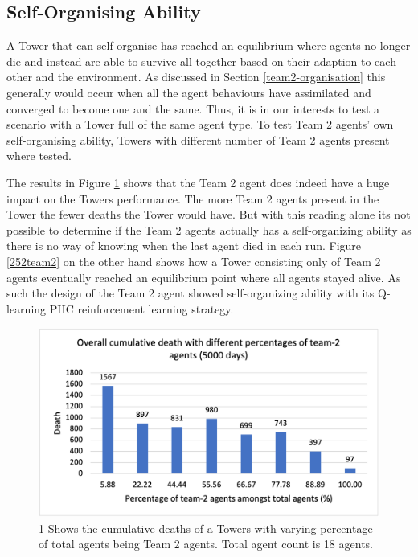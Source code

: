 \subsection{Self-Organising Ability}
A Tower that can self-organise has reached an equilibrium where agents no longer die and instead are able to survive all together based on their adaption to each other and the environment. As discussed in Section \ref{team2-organisation} this generally would occur when all the agent behaviours have assimilated and converged to become one and the same. Thus, it is in our interests to test a scenario with a Tower full of the same agent type. To test Team 2 agents’ own self-organising ability, Towers with different number of Team 2 agents present where tested.

The results in Figure \ref{251team2} shows that the Team 2 agent does indeed have a huge impact on the Towers performance. The more Team 2 agents present in the Tower the fewer deaths the Tower would have. But with this reading alone its not possible to determine if the Team 2 agents actually has a self-organizing ability as there is no way of knowing when the last agent died in each run. Figure \ref{252team2} on the other hand shows how a Tower consisting only of Team 2 agents eventually reached an equilibrium point where all agents stayed alive. As such the design of the Team 2 agent showed self-organizing ability with its Q-learning PHC reinforcement learning strategy.

\begin{figure}
\centering
\includegraphics{004_team_2_agent_design/251team2}
\caption{1 Shows the cumulative deaths of a Towers with varying percentage of total agents being Team 2 agents. Total agent count is 18 agents.}
\label{251team2}
\end{figure}

